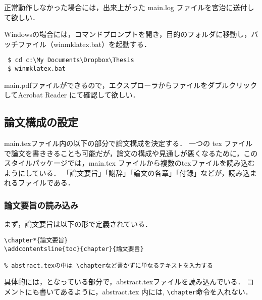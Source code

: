 正常動作しなかった場合には，出来上がった main.log ファイルを宮治に送付して欲しい．

Windowsの場合には，コマンドプロンプトを開き，目的のフォルダに移動し，バッチファイル（winmklatex.bat）を起動する．
\begin{screen}
{\small
\begin{verbatim}
 $ cd c:\My Documents\Dropbox\Thesis
 $ winmklatex.bat
\end{verbatim}
}
\end{screen}
main.pdfファイルができるので，エクスプローラからファイルをダブルクリックしてAcrobat Reader にて確認して欲しい．

\subsection{論文構成の設定}
main.texファイル内の以下の部分で論文構成を決定する．
一つの tex ファイルで論文を書ききることも可能だが，論文の構成や見通しが悪くなるために，このスタイルパッケージでは，main.tex ファイルから複数のtexファイルを読み込むようにしている．
「論文要旨」「謝辞」「論文の各章」「付録」などが，読み込まれるファイルである．

\subsubsection{論文要旨の読み込み}
まず，論文要旨は以下の形で定義されている．
\begin{breakbox}
{\small
\begin{verbatim}
\chapter*{論文要旨}
\addcontentsline{toc}{chapter}{論文要旨}

% abstract.texの中は \chapterなど書かずに単なるテキストを入力する
\end{verbatim}
}
\end{breakbox}
具体的には，\verb++となっている部分で，abstract.texファイルを読み込んでいる．
コメントにも書いてあるように，abstract.tex 内には, \verb+\chapter+命令を入れない．

